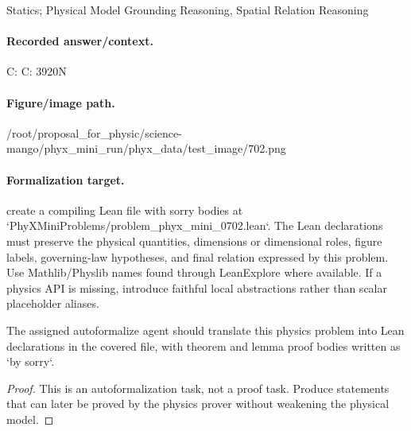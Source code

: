 Statics; Physical Model Grounding Reasoning, Spatial Relation Reasoning

\paragraph{Recorded answer/context.}
C: C: 3920N

\paragraph{Figure/image path.}
/root/proposal\_for\_physic/science-mango/phyx\_mini\_run/phyx\_data/test\_image/702.png

\paragraph{Formalization target.}
create a compiling Lean file with sorry bodies at `PhyXMiniProblems/problem\_phyx\_mini\_0702.lean`. The Lean declarations must preserve the physical quantities, dimensions or dimensional roles, figure labels, governing-law hypotheses, and final relation expressed by this problem.
Use Mathlib/Physlib names found through LeanExplore where available. If a physics API is missing, introduce faithful local abstractions rather than scalar placeholder aliases.

\begin{theorem}
\label{thm:physics:phyx_mini_0702:target}
The assigned autoformalize agent should translate this physics problem into Lean declarations in the covered file, with theorem and lemma proof bodies written as `by sorry`.
\end{theorem}
\begin{proof}
This is an autoformalization task, not a proof task. Produce statements that can later be proved by the physics prover without weakening the physical model.
\end{proof}

